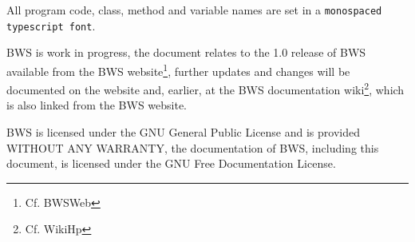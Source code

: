 All program code, class, method and variable names are set in a \texttt{monospaced typescript font}. 

BWS is work in progress, the document relates to the 1.0 release of BWS available from the BWS website\footnote{Cf. BWSWeb}, further updates and changes will be documented on the website and, earlier, at the BWS documentation wiki\footnote{Cf. WikiHp}, which is also linked from the BWS website.

BWS is licensed under the GNU General Public License and is provided WITHOUT ANY WARRANTY, the documentation of BWS, including this document, is licensed under the GNU Free Documentation License.

